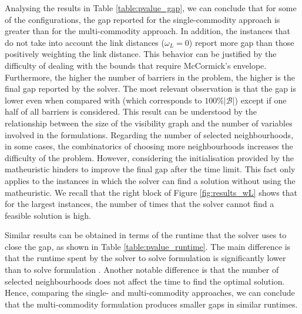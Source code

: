 \documentclass[a4paper,  review, authoryear, 1p.]{elsarticle}
\newcommand{\KMPHN}{{\sf{H-KMPHN}}}
\newcommand{\KMPN}{{\sf{H-KMPN}\xspace }}
\begin{document}
{%
		
		Analysing the results in Table \ref{table:pvalue_gap}, we can conclude that for some of the configurations, the gap reported for the single-commodity approach is greater than for the multi-commodity approach. In addition, the instances that do not take into account the link distances ($\omega_L=0$) report more gap than those positively weighting the link distance. This behavior can be justified by the difficulty of dealing with the bounds that require McCormick's envelope. Furthermore, the higher the number of barriers in the problem, the higher is the final gap reported by the solver. The most relevant observation is that the gap is lower even when compared with \KMPN\xspace (which corresponds to $100\% |\mathcal{B}|$) except if one half of all barriers is considered. This result can be understood by the relationship between the size of the visibility graph and the number of variables involved in the formulations. Regarding the number of selected neighbourhoods, in some cases, the combinatorics of choosing more neighbourhoods increases the difficulty of the problem. However, considering the initialisation provided by the matheuristic hinders to improve the final gap after the time limit. This fact only applies to the instances in which the solver can find a solution without using the matheuristic. We recall that the right block of Figure \ref{fig:results_wL} shows that for the largest instances, the number of times that the solver cannot find a feasible solution is high.
		
		Similar results can be obtained in terms of the runtime that the solver uses to close the gap, as shown in Table \ref{table:pvalue_runtime}. The main difference is that the runtime spent by the solver to solve formulation \KMPN \xspace is significantly lower than to solve formulation \KMPHN. Another notable difference is that the number of selected neighbourhoods does not affect the time to find the optimal solution. Hence, comparing the single- and multi-commodity approaches, we can conclude that the multi-commodity formulation produces smaller gaps in similar runtimes. }
		
\end{document}
